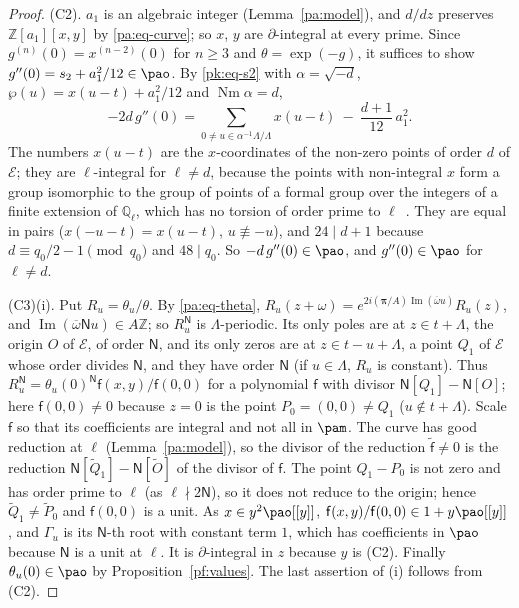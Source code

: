 \documentclass[10pt]{amsart}
\theoremstyle{definition}
\theoremstyle{remark}
\newcommand{\Z}{\mathbb Z}
\newcommand{\Q}{\mathbb Q}
\newcommand{\Iml}{\operatorname{Im}}
\providecommand{\auNm}{\operatorname{Nm}}
\providecommand{\aubar}[1]{\overline{#1}}
\begin{document}
\begin{proof}
(C2). $a_1$ is an algebraic integer (Lemma~\ref{pa:model}), and $d/dz$ preserves $\Z[a_1][x,y]$ by
\eqref{pa:eq-curve}; so $x$, $y$ are $\partial$-integral at every prime. Since $g^{(n)}(0)=
x^{(n-2)}(0)$ for $n\ge3$ and $\theta=\exp(-g)$, it suffices to show $g''(0)=s_2+a_1^2/12\in\pao$.
By \eqref{pk:eq-s2} with $\alpha=\sqrt{-d}$, $\wp(u)=x(u-t)+a_1^2/12$ and $\auNm\alpha=d$,
\[
-2d\,g''(0)=\sum_{0\ne u\in\alpha^{-1}\Lambda/\Lambda}x(u-t)\ -\ \frac{d+1}{12}\,a_1^2 .
\]
The numbers $x(u-t)$ are the $x$-coordinates of the non-zero points of order $d$ of $\mathcal E$;
they are $\ell$-integral for $\ell\ne d$, because the points with non-integral $x$ form a group
isomorphic to the group of points of a formal group over the integers of a finite extension of
$\Q_\ell$, which has no torsion of order prime to $\ell$~\cite[Chapter~VII, Proposition~2.2, and Chapter~IV, Proposition~3.2(b)]{SilvermanAEC}.
They are equal in pairs ($x(-u-t)=x(u-t)$, $u\not\equiv-u$), and $24\mid d+1$ because $d\equiv
q_0/2-1\pmod{q_0}$ and $48\mid q_0$. So $-d\,g''(0)\in\pao$, and $g''(0)\in\pao$ for $\ell\ne d$.

(C3)(i). Put $R_u=\theta_u/\theta$. By \eqref{pa:eq-theta}, $R_u(z+\omega)=e^{2i(\boldsymbol\pi/A)
\Iml(\aubar\omega u)}R_u(z)$, and $\Iml(\aubar\omega\mathsf Nu)\in A\Z$; so $R_u^{\mathsf N}$ is
$\Lambda$-periodic. Its only poles are at $z\in t+\Lambda$, the origin $O$ of $\mathcal E$, of order $\mathsf N$, and its only zeros are at $z\in t-u+\Lambda$, a point $Q_1$ of $\mathcal E$
whose order divides $\mathsf N$, and they have order $\mathsf N$ (if $u\in\Lambda$, $R_u$ is
constant). Thus $R_u^{\mathsf N}=\theta_u(0)^{\mathsf N}\mathsf f(x,y)/
\mathsf f(0,0)$ for a polynomial $\mathsf f$ with divisor $\mathsf N[Q_1]-\mathsf N[O]$; here
$\mathsf f(0,0)\ne0$ because $z=0$ is the point $P_0=(0,0)\ne Q_1$ ($u\notin t+\Lambda$). Scale
$\mathsf f$ so that its coefficients are integral and not all in $\pam$. The curve has good
reduction at $\ell$ (Lemma~\ref{pa:model}), so the divisor of the reduction $\tilde{\mathsf f}\ne0$
is the reduction $\mathsf N[\tilde Q_1]-\mathsf N[\tilde O]$ of the divisor of $\mathsf f$. The
point $Q_1-P_0$ is not zero and has order prime to $\ell$ (as $\ell\nmid2\mathsf N$), so it does
not reduce to the origin; hence $\tilde Q_1\ne\tilde P_0$ and $\mathsf f(0,0)$ is a unit. As $x\in
y^2\pao[[y]]$, $\mathsf f(x,y)/\mathsf f(0,0)\in1+y\pao[[y]]$, and $\Gamma_u$ is its $\mathsf N$-th
root with constant term $1$, which has coefficients in $\pao$ because $\mathsf N$ is a unit at
$\ell$. It is $\partial$-integral in $z$ because $y$ is (C2). Finally $\theta_u(0)\in\pao$ by Proposition~\ref{pf:values}.
The last assertion of (i) follows from (C2).


\end{proof}
\end{document}
